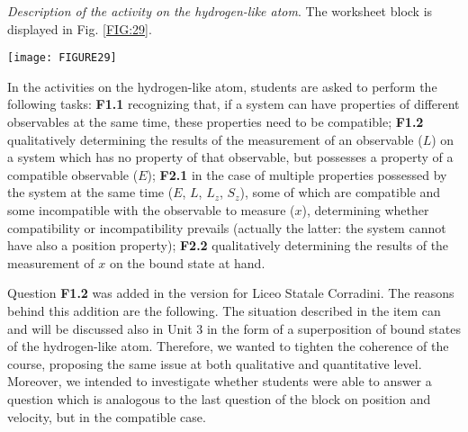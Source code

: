 \documentclass[twocolumn,secnumarabic,amssymb, nobibnotes, aps, prd, nofootinbib]{revtex4-2}
\begin{document}
\emph{Description of the activity on the hydrogen-like atom}. The worksheet block is displayed in Fig. \ref{FIG:29}.
\begin{figure*}[!htpb]
       \texttt{[image: FIGURE29]}
    \caption{Using the relations between properties to discuss ideal measurement in the context of the hydrogen-like atom: the worksheet blocks administered in the Summer School of Excellence, Udine, 2018, and Liceo Statale Corradini, Thiene, 2018, are identical, except for item F1.2, which was added in the Liceo version.}
    \label{FIG:29}
\end{figure*}
In the activities on the hydrogen-like atom, students are asked to perform the following tasks: \textbf{F1.1} recognizing that, if a system can have properties of different observables at the same time, these properties need to be compatible; \textbf{F1.2}  qualitatively determining the results of the measurement of an observable ($L$) on a system which has no property of that observable, but possesses a property of a compatible observable ($E$); \textbf{F2.1} in the case of multiple properties possessed by the system at the same time ($E$, $L$, $L_z$, $S_z$), some of which are compatible and some incompatible with the observable to measure ($x$), determining whether compatibility or incompatibility prevails (actually the latter: the system cannot have also a position property); \textbf{F2.2} qualitatively determining the results of the measurement of $x$ on the bound state at hand.

Question \textbf{F1.2} was added in the version for Liceo Statale Corradini. The reasons behind this addition are the following. The situation described in the item can and will be discussed also in Unit 3 in the form of a superposition of bound states of the hydrogen-like atom. Therefore, we wanted to tighten the coherence of the course, proposing the same issue at both qualitative and quantitative level. Moreover, we intended to investigate whether students were able to answer a question which is analogous to the last question of the block on position and velocity, but in the compatible case.
\end{document}
